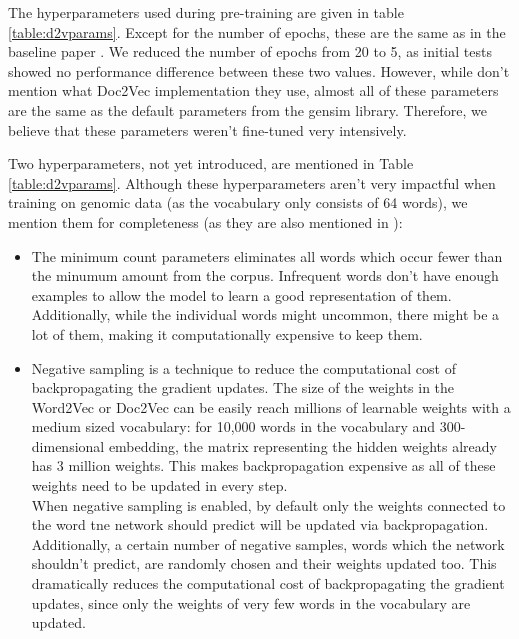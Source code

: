 The hyperparameters used during pre-training are given in table \ref{table:d2vparams}. Except for the number of epochs, these are the same as in the baseline paper \cite{d2vsplicing}. We reduced the number of epochs from 20 to 5, as initial tests showed no performance difference between these two values. However, while \cite{d2vsplicing} don't mention what Doc2Vec implementation they use, almost all of these parameters are the same as the default parameters from the gensim library. Therefore, we believe that these parameters weren't fine-tuned very intensively. 

Two hyperparameters, not yet introduced, are mentioned in Table \ref{table:d2vparams}. Although these hyperparameters aren't very impactful when training on genomic data (as the vocabulary only consists of 64 words), we mention them for completeness (as they are also mentioned in \cite{d2vsplicing}):
\begin{itemize}
	\item The minimum count parameters eliminates all words which occur fewer than the minumum amount from the corpus. Infrequent words don't have enough examples to allow the model to learn a good representation of them. Additionally, while the individual words might uncommon, there might be a lot of them, making it computationally expensive to keep them.
	
	\item Negative sampling \cite{w2v2} 
	is a technique to reduce the computational cost of backpropagating the gradient updates. The size of the weights in the Word2Vec or Doc2Vec can be easily reach millions of learnable weights with a medium sized vocabulary: for 10,000 words in the vocabulary and 300-dimensional embedding, the matrix representing the hidden weights already has 3 million weights. This makes backpropagation expensive as all of these weights need to be updated in every step. \\
	When negative sampling is enabled, by default only the weights connected to the word tne network should predict will be updated via backpropagation. Additionally, a certain number of negative samples, words which the network shouldn't predict, are randomly chosen and their weights updated too. This dramatically reduces the computational cost of backpropagating the gradient updates, since only the weights of very few words in the vocabulary are updated. 
\end{itemize}



 

